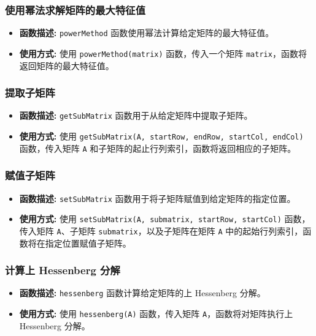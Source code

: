 \documentclass{article}
\begin{document}
\subsubsection*{使用幂法求解矩阵的最大特征值}
\begin{itemize}
	\item \textbf{函数描述:} \texttt{powerMethod} 函数使用幂法计算给定矩阵的最大特征值。
	\item \textbf{使用方式:} 使用 \texttt{powerMethod(matrix)} 函数，传入一个矩阵 \texttt{matrix}，函数将返回矩阵的最大特征值。
\end{itemize}

\subsubsection*{提取子矩阵}
\begin{itemize}
	\item \textbf{函数描述:} \texttt{getSubMatrix} 函数用于从给定矩阵中提取子矩阵。
	\item \textbf{使用方式:} 使用 \texttt{getSubMatrix(A, startRow, endRow, startCol, endCol)} 函数，传入矩阵 \texttt{A} 和子矩阵的起止行列索引，函数将返回相应的子矩阵。
\end{itemize}

\subsubsection*{赋值子矩阵}
\begin{itemize}
	\item \textbf{函数描述:} \texttt{setSubMatrix} 函数用于将子矩阵赋值到给定矩阵的指定位置。
	\item \textbf{使用方式:} 使用 \texttt{setSubMatrix(A, submatrix, startRow, startCol)} 函数，传入矩阵 \texttt{A}、子矩阵 \texttt{submatrix}，以及子矩阵在矩阵 \texttt{A} 中的起始行列索引，函数将在指定位置赋值子矩阵。
\end{itemize}

\subsubsection*{计算上 Hessenberg 分解}
\begin{itemize}
	\item \textbf{函数描述:} \texttt{hessenberg} 函数计算给定矩阵的上 Hessenberg 分解。
	\item \textbf{使用方式:} 使用 \texttt{hessenberg(A)} 函数，传入矩阵 \texttt{A}，函数将对矩阵执行上 Hessenberg 分解。
\end{itemize}
\end{document}
